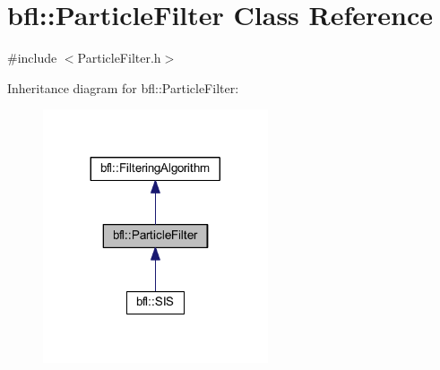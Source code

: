 \hypertarget{classbfl_1_1ParticleFilter}{}\section{bfl\+:\+:Particle\+Filter Class Reference}
\label{classbfl_1_1ParticleFilter}


{\ttfamily \#include $<$Particle\+Filter.\+h$>$}



Inheritance diagram for bfl\+:\+:Particle\+Filter\+:
\nopagebreak
\begin{figure}[H]
\begin{center}
\leavevmode
\includegraphics[width=188pt]{classbfl_1_1ParticleFilter__inherit__graph}
\end{center}
\end{figure}
